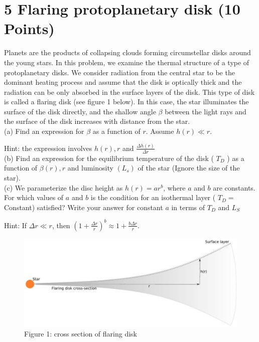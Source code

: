 \documentclass[10pt]{article}
\begin{document}
\section*{5 Flaring protoplanetary disk (10 Points)}
Planets are the products of collapsing clouds forming circumstellar disks around the young stars. In this problem, we examine the thermal structure of a type of protoplanetary disks. We consider radiation from the central star to be the dominant heating process and assume that the disk is optically thick and the radiation can be only absorbed in the surface layers of the disk. This type of disk is called a flaring disk (see figure 1 below). In this case, the star illuminates the surface of the disk directly, and the shallow angle $\beta$ between the light rays and the surface of the disk increases with distance from the star.\\
(a) Find an expression for $\beta$ as a function of $r$. Assume $h(r) \ll r$.

Hint: the expression involves $h(r), r$ and $\frac{\Delta h(r)}{\Delta r}$\\
(b) Find an expression for the equilibrium temperature of the disk ( $T_{D}$ ) as a function of $\beta(r), r$ and luminosity $\left(L_{s}\right)$ of the star (Ignore the size of the star).\\
(c) We parameterize the disc height as $h(r)=a r^{b}$, where $a$ and $b$ are constants. For which values of $a$ and $b$ is the condition for an isothermal layer ( $T_{D}=$ Constant) satisfied? Write your answer for constant $a$ in terms of $T_{D}$ and $L_{S}$

Hint: If $\Delta r \ll r$, then $\left(1+\frac{\Delta r}{r}\right)^{b} \approx 1+\frac{b \Delta r}{r}$.

\begin{figure}[h]
\begin{center}
  \includegraphics[width=\textwidth]{2025_09_11_6312450c103d6a7e5736g-03}
\captionsetup{labelformat=empty}
\caption{Figure 1: cross section of flaring disk}
\end{center}
\end{figure}
\end{document}
